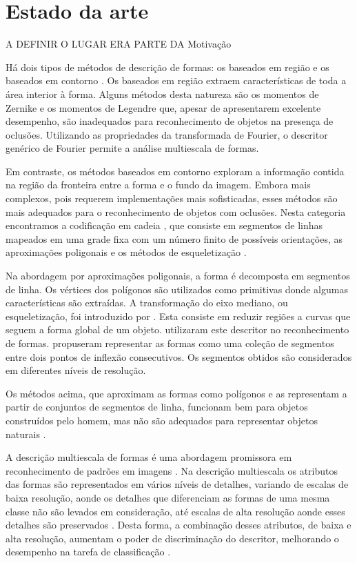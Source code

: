 \section {Estado da arte \label{sec:est_art}}
   
{\color{red} A DEFINIR O LUGAR ERA PARTE DA Motivação}

Há dois tipos de métodos de descrição de formas: os baseados em região e os baseados em contorno \cite{Zhang:2004}. Os baseados em região extraem características de toda a área interior à forma. Alguns métodos desta natureza são os momentos de Zernike \cite{Kim:2000} e os momentos de Legendre \cite{Yang:2006} que, apesar de apresentarem excelente desempenho, são inadequados para reconhecimento de objetos na presença de oclusões. Utilizando as propriedades da transformada de Fourier, o descritor genérico de Fourier \cite{Zhang:2002} permite a análise multiescala de formas.

Em contraste, os métodos baseados em contorno exploram a informação contida na região da fronteira entre a forma e o fundo da imagem. Embora mais complexos, pois requerem implementações mais sofisticadas, esses métodos são mais adequados para o reconhecimento de objetos com oclusões. Nesta categoria encontramos a codificação em cadeia \cite[p~337]{Costa:2009}, que consiste em segmentos de linhas mapeados em uma grade fixa com um número finito de possíveis orientações, as aproximações poligonais \cite[p~340--351]{Costa:2009} e os métodos de esqueletização \cite[p~394--400]{Costa:2009}. 

Na abordagem por aproximações poligonais, a forma é decomposta em segmentos de linha. Os vértices dos polígonos são utilizados como primitivas donde algumas características são extraídas. A transformação do eixo mediano, ou esqueletização, foi introduzido por . Esta consiste em reduzir regiões a curvas que seguem a forma global de um objeto.  utilizaram este descritor no reconhecimento de formas.  propuseram representar as formas como uma coleção de segmentos entre dois pontos de inflexão consecutivos. Os segmentos obtidos são considerados em diferentes níveis de resolução. 

Os métodos acima, que aproximam as formas como polígonos e as representam a partir de conjuntos de segmentos de linha, funcionam bem para objetos construídos pelo homem, mas não são adequados para representar objetos naturais \cite{Zhang:2004}.

A descrição multiescala de formas é uma abordagem promissora em reconhecimento de padrões em imagens \cite{Direkoglu:2011}. Na descrição multiescala os atributos das formas são representados em vários níveis de detalhes, variando de escalas de baixa resolução, aonde os detalhes que diferenciam as formas de uma mesma classe não são levados em consideração, até escalas de alta resolução aonde esses detalhes são preservados \cite{Ullman:1996}. Desta forma, a combinação desses atributos, de baixa e alta resolução, aumentam o poder de discriminação do descritor, melhorando o desempenho na tarefa de classificação \cite{Direkoglu:2011}.

